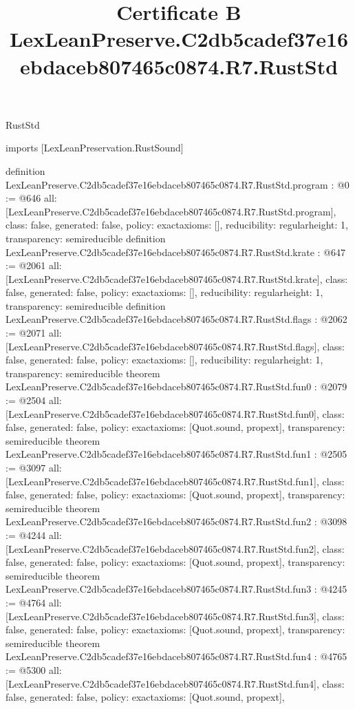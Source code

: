 \begin{lexlean}{RustStd}
\title{Certificate B LexLeanPreserve.C2db5cadef37e16ebdaceb807465c0874.R7.RustStd}
\begin{coremodule}
imports [LexLeanPreservation.RustSound]

definition LexLeanPreserve.C2db5cadef37e16ebdaceb807465c0874.R7.RustStd.program : @0 := @646 {
  all: [LexLeanPreserve.C2db5cadef37e16ebdaceb807465c0874.R7.RustStd.program],
  class: false,
  generated: false,
  policy: exact{axioms: []},
  reducibility: regular{height: 1},
  transparency: semireducible
}
definition LexLeanPreserve.C2db5cadef37e16ebdaceb807465c0874.R7.RustStd.krate : @647 := @2061 {
  all: [LexLeanPreserve.C2db5cadef37e16ebdaceb807465c0874.R7.RustStd.krate],
  class: false,
  generated: false,
  policy: exact{axioms: []},
  reducibility: regular{height: 1},
  transparency: semireducible
}
definition LexLeanPreserve.C2db5cadef37e16ebdaceb807465c0874.R7.RustStd.flags : @2062 := @2071 {
  all: [LexLeanPreserve.C2db5cadef37e16ebdaceb807465c0874.R7.RustStd.flags],
  class: false,
  generated: false,
  policy: exact{axioms: []},
  reducibility: regular{height: 1},
  transparency: semireducible
}
theorem LexLeanPreserve.C2db5cadef37e16ebdaceb807465c0874.R7.RustStd.fun0 : @2079 := @2504 {
  all: [LexLeanPreserve.C2db5cadef37e16ebdaceb807465c0874.R7.RustStd.fun0],
  class: false,
  generated: false,
  policy: exact{axioms: [Quot.sound, propext]},
  transparency: semireducible
}
theorem LexLeanPreserve.C2db5cadef37e16ebdaceb807465c0874.R7.RustStd.fun1 : @2505 := @3097 {
  all: [LexLeanPreserve.C2db5cadef37e16ebdaceb807465c0874.R7.RustStd.fun1],
  class: false,
  generated: false,
  policy: exact{axioms: [Quot.sound, propext]},
  transparency: semireducible
}
theorem LexLeanPreserve.C2db5cadef37e16ebdaceb807465c0874.R7.RustStd.fun2 : @3098 := @4244 {
  all: [LexLeanPreserve.C2db5cadef37e16ebdaceb807465c0874.R7.RustStd.fun2],
  class: false,
  generated: false,
  policy: exact{axioms: [Quot.sound, propext]},
  transparency: semireducible
}
theorem LexLeanPreserve.C2db5cadef37e16ebdaceb807465c0874.R7.RustStd.fun3 : @4245 := @4764 {
  all: [LexLeanPreserve.C2db5cadef37e16ebdaceb807465c0874.R7.RustStd.fun3],
  class: false,
  generated: false,
  policy: exact{axioms: [Quot.sound, propext]},
  transparency: semireducible
}
theorem LexLeanPreserve.C2db5cadef37e16ebdaceb807465c0874.R7.RustStd.fun4 : @4765 := @5300 {
  all: [LexLeanPreserve.C2db5cadef37e16ebdaceb807465c0874.R7.RustStd.fun4],
  class: false,
  generated: false,
  policy: exact{axioms: [Quot.sound, propext]},
}
\end{coremodule}
\end{lexlean}
